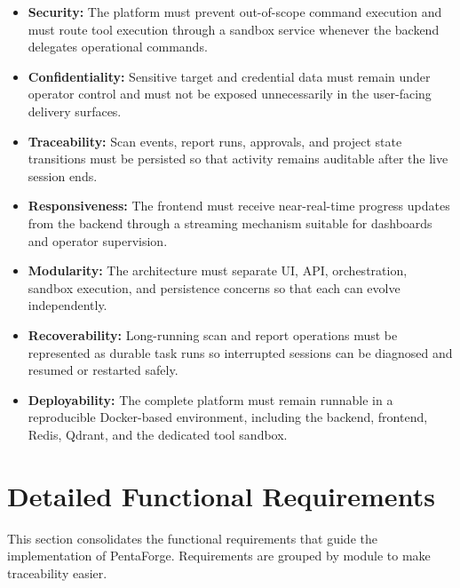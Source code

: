 \documentclass[12pt,a4paper]{report}
\begin{document}
\begin{itemize}
    \item \textbf{Security:} The platform must prevent out-of-scope command
    execution and must route tool execution through a sandbox service whenever the
    backend delegates operational commands.

    \item \textbf{Confidentiality:} Sensitive target and credential data must remain
    under operator control and must not be exposed unnecessarily in the user-facing
    delivery surfaces.

    \item \textbf{Traceability:} Scan events, report runs, approvals, and project
    state transitions must be persisted so that activity remains auditable after the
    live session ends.

    \item \textbf{Responsiveness:} The frontend must receive near-real-time progress
    updates from the backend through a streaming mechanism suitable for dashboards
    and operator supervision.

    \item \textbf{Modularity:} The architecture must separate UI, API, orchestration,
    sandbox execution, and persistence concerns so that each can evolve independently.

    \item \textbf{Recoverability:} Long-running scan and report operations must be
    represented as durable task runs so interrupted sessions can be diagnosed and
    resumed or restarted safely.

    \item \textbf{Deployability:} The complete platform must remain runnable in a
    reproducible Docker-based environment, including the backend, frontend, Redis,
    Qdrant, and the dedicated tool sandbox.
\end{itemize}

\section{Detailed Functional Requirements}

This section consolidates the functional requirements that guide the implementation of
PentaForge. Requirements are grouped by module to make traceability easier.
\end{document}
